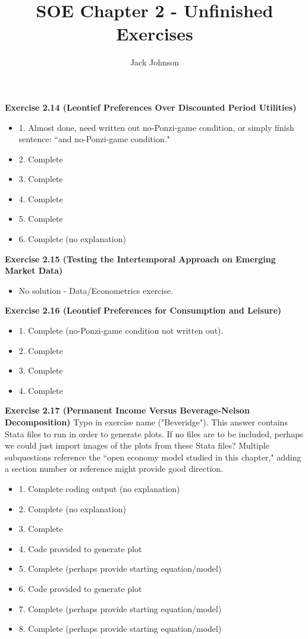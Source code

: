 \documentclass{article}
\title{SOE Chapter 2 - Unfinished Exercises}
\author{Jack Johnson}
\begin{document}
\maketitle
\noindent
\textbf{Exercise 2.14 (Leontief Preferences Over Discounted Period Utilities)}
\begin{itemize}
    \item[] 1. Almost done, need written out no-Ponzi-game condition, or simply finish sentence: ``and no-Ponzi-game condition."
    \item[] 2. Complete
    \item[] 3. Complete
    \item[] 4. Complete
    \item[] 5. Complete
    \item[] 6. Complete (no explanation)
\end{itemize}

\noindent
\textbf{Exercise 2.15 (Testing the Intertemporal Approach on Emerging Market Data)}
\begin{itemize}
    \item[] No solution - Data/Econometrics exercise.
\end{itemize}

\noindent
\textbf{Exercise 2.16 (Leontief Preferences for Consumption and Leisure)}
\begin{itemize}
    \item[] 1. Complete (no-Ponzi-game condition not written out).
    \item[] 2. Complete
    \item[] 3. Complete
    \item[] 4. Complete
\end{itemize}

\noindent
\textbf{Exercise 2.17 (Permanent Income Versus Beverage-Nelson Decomposition)}
Typo in exercise name ("Beveridge"). This answer contains Stata files to run in order to generate plots. If no files are to be included, perhaps we could just import images of the plots from these Stata files? Multiple subquestions reference the ``open economy model studied in this chapter," adding a section number or reference might provide good direction.
\begin{itemize}
    \item[] 1. Complete coding output (no explanation)
    \item[] 2. Complete (no explanation)
    \item[] 3. Complete
    \item[] 4. Code provided to generate plot
    \item[] 5. Complete (perhaps provide starting equation/model)
    \item[] 6. Code provided to generate plot
    \item[] 7. Complete (perhaps provide starting equation/model)
    \item[] 8. Complete (perhaps provide starting equation/model)
\end{itemize}
\end{document}

